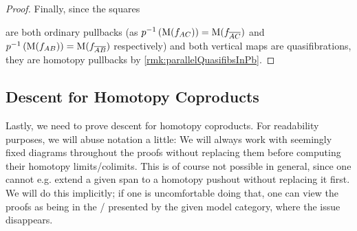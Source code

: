 \begin{prop}
\begin{proof}
        Finally, since the squares 
        \begin{center}
        \end{center}
        are both ordinary pullbacks (as $p^{-1}\left(\operatorname{M}(f_{AC})\right)=\operatorname{M}(f_{\overline{A}\overline{C}})$ and $p^{-1}\left(\operatorname{M}(f_{AB})\right)=\operatorname{M}(f_{\overline{A}\overline{B}})$ respectively) and both vertical maps are quasifibrations, they are homotopy pullbacks by \cref{rmk:parallelQuasifibsInPb}.
    \end{proof}
\end{prop}
\subsection*{Descent for Homotopy Coproducts}
Lastly, we need to prove descent for homotopy coproducts.
For readability purposes, we will abuse notation a little:
We will always work with seemingly fixed diagrams throughout the proofs without replacing them before computing their homotopy limits/colimits.
This is of course not possible in general, since one cannot e.g. extend a given span to a homotopy pushout without replacing it first.
We will do this implicitly; if one is uncomfortable doing that, one can view the proofs as being in the \inftycat/ presented by the given model category, where the issue disappears.

